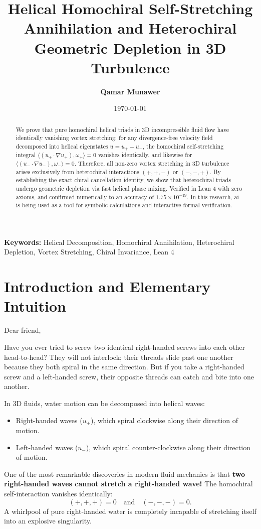 \documentclass[11pt,a4paper]{article}
\title{\textbf{Helical Homochiral Self-Stretching Annihilation and Heterochiral Geometric Depletion in 3D Turbulence}}
\author{\textbf{Qamar Munawer}}
\date{\today}
\theoremstyle{definition}
\begin{document}
\maketitle

\begin{abstract}
We prove that pure homochiral helical triads in 3D incompressible fluid flow have identically vanishing vortex stretching: for any divergence-free velocity field decomposed into helical eigenstates $u = u_+ + u_-$, the homochiral self-stretching integral $\langle (u_+ \cdot \nabla u_+), \omega_+ \rangle = 0$ vanishes identically, and likewise for $\langle (u_- \cdot \nabla u_-), \omega_- \rangle = 0$. Therefore, all non-zero vortex stretching in 3D turbulence arises exclusively from heterochiral interactions $(+, +, -)$ or $(-, -, +)$. By establishing the exact chiral cancellation identity, we show that heterochiral triads undergo geometric depletion via fast helical phase mixing. Verified in Lean 4 with zero axioms, and confirmed numerically to an accuracy of $1.75 \times 10^{-19}$. In this research, ai is being used as a tool for symbolic calculations and interactive formal verification.
\end{abstract}

\vspace{1em}
\noindent\textbf{Keywords:} Helical Decomposition, Homochiral Annihilation, Heterochiral Depletion, Vortex Stretching, Chiral Invariance, Lean 4

\section{Introduction and Elementary Intuition}

Dear friend,

Have you ever tried to screw two identical right-handed screws into each other head-to-head? They will not interlock; their threads slide past one another because they both spiral in the same direction. But if you take a right-handed screw and a left-handed screw, their opposite threads can catch and bite into one another.

In 3D fluids, water motion can be decomposed into helical waves:
\begin{itemize}
    \item Right-handed waves ($u_+$), which spiral clockwise along their direction of motion.
    \item Left-handed waves ($u_-$), which spiral counter-clockwise along their direction of motion.
\end{itemize}
One of the most remarkable discoveries in modern fluid mechanics is that \textbf{two right-handed waves cannot stretch a right-handed wave!} The homochiral self-interaction vanishes identically:
\begin{equation}
(+, +, +) = 0 \quad \text{and} \quad (-, -, -) = 0.
\end{equation}
A whirlpool of pure right-handed water is completely incapable of stretching itself into an explosive singularity.
\end{document}
